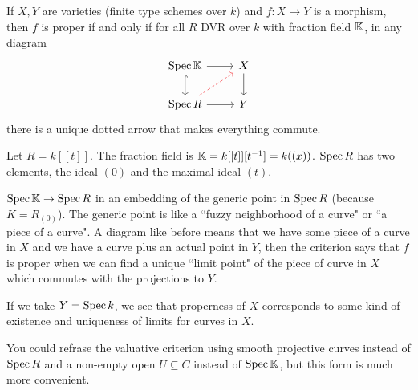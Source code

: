 \begin{fact}\label{FctValuativeCriterionForProperness}
If $X,Y$ are varieties (finite type schemes over $k$) and $f:X\to Y$ is a morphism, then $f$ is proper if and only if for all $R$ DVR over $k$ with fraction field $\mathbb{K}$, in any diagram
\[\begin{tikzcd}
	{\Spec \K} & X \\
	{\Spec R} & Y
	\arrow[from=1-1, to=1-2]
	\arrow[hook, from=1-1, to=2-1]
	\arrow[from=1-2, to=2-2]
	\arrow[color={rgb,255:red,240;green,0;blue,8}, dashed, from=2-1, to=1-2]
	\arrow[from=2-1, to=2-2]
\end{tikzcd}\]
there is a unique dotted arrow that makes everything commute.
\end{fact}

\begin{example}
Let $R=k[[t]]$. The fraction field is $\mathbb{K}=k[[t]][t^{-1}]=k((x))$. $\operatorname{Spec} R$ has two elements, the ideal $(0)$ and the maximal ideal $(t)$. 

$\operatorname{Spec} \mathbb{K}\to \operatorname{Spec} R$ in an embedding of the generic point in $\operatorname{Spec} R$ (because $K=R_{(0)}$). The generic point is like a ``fuzzy neighborhood of a curve" or ``a piece of a curve". A diagram like before means that we have some piece of a curve in $X$ and we have a curve plus an actual point in $Y$, then the criterion says that $f$ is proper when we can find a unique ``limit point" of the piece of curve in $X$ which commutes with the projections to $Y$.

If we take $Y=\operatorname{Spec} k$, we see that properness of $X$ corresponds to some kind of existence and uniqueness of limits for curves in $X$.
\end{example}


\begin{remark}
You could refrase the valuative criterion using smooth projective curves instead of $\operatorname{Spec} R$ and a non-empty open $U\subseteq C$ instead of $\operatorname{Spec} \mathbb{K}$, but this form is much more convenient.
\end{remark}


